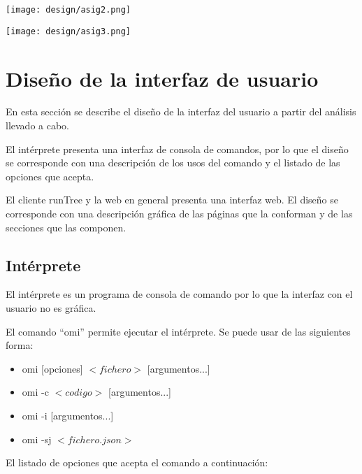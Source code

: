 \begin{center}
\texttt{[image: design/asig2.png]} 
\end{center}

\begin{center}
\texttt{[image: design/asig3.png]} 
\end{center}

\section{Diseño de la interfaz de usuario}
En esta sección se describe el diseño de la interfaz del usuario a partir del análisis llevado a cabo.

El intérprete presenta una interfaz de consola de comandos, por lo que el diseño se corresponde con una descripción de los usos 
del comando y el listado de las opciones que acepta.

El cliente runTree y la web en general presenta una interfaz web. El diseño se corresponde con una descripción 
gráfica de las páginas que la conforman y de las secciones que las componen.
\subsection{Intérprete}
El intérprete es un programa de consola de comando por lo que la interfaz con el usuario no es gráfica.

El comando ``omi'' permite ejecutar el intérprete. Se puede usar de las siguientes forma:
\begin{itemize}
   \item omi [opciones] $<fichero>$ [argumentos...]
   \item omi -c $<codigo>$ [argumentos...]
   \item omi -i [argumentos...]
   \item omi -sj $<fichero.json>$
\end{itemize}

El listado de opciones que acepta el comando a continuación:

